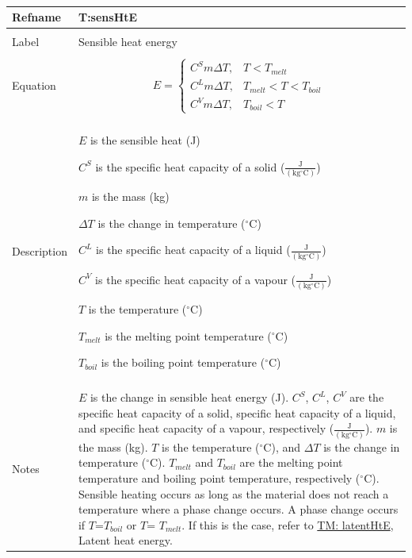 \documentclass[12pt]{article}
\begin{document}
~\newline
\noindent \begin{minipage}{\textwidth}
\begin{tabular}{p{} p{}}
\toprule \textbf{Refname} & \textbf{T:sensHtE}
\label{T:sensHtE}
\\ \midrule \\
Label & Sensible heat energy
\\ \midrule \\
Equation & \begin{dmath}
           E=\begin{cases}
{C^{S}} m ΔT, & T<{T_{melt}}\\
{C^{L}} m ΔT, & {T_{melt}}<T<{T_{boil}}\\
{C^{V}} m ΔT, & {T_{boil}}<T
\end{cases}
           \end{dmath}
\\ \midrule \\
Description & \begin{symbDescription}
              \item{$E$ is the sensible heat (J)}
              \item{${C^{S}}$ is the specific heat capacity of a solid ($\frac{\text{J}}{(\text{kg}{}^{\circ}\text{C})}$)}
              \item{$m$ is the mass (kg)}
              \item{$ΔT$ is the change in temperature (${}^{\circ}$C)}
              \item{${C^{L}}$ is the specific heat capacity of a liquid ($\frac{\text{J}}{(\text{kg}{}^{\circ}\text{C})}$)}
              \item{${C^{V}}$ is the specific heat capacity of a vapour ($\frac{\text{J}}{(\text{kg}{}^{\circ}\text{C})}$)}
              \item{$T$ is the temperature (${}^{\circ}$C)}
              \item{${T_{melt}}$ is the melting point temperature (${}^{\circ}$C)}
              \item{${T_{boil}}$ is the boiling point temperature (${}^{\circ}$C)}
              \end{symbDescription}
\\ \midrule \\
Notes & $E$ is the change in sensible heat energy (J). ${C^{S}}$, ${C^{L}}$, ${C^{V}}$ are the specific heat capacity of a solid, specific heat capacity of a liquid, and specific heat capacity of a vapour, respectively ($\frac{\text{J}}{(\text{kg}{}^{\circ}\text{C})}$). $m$ is the mass (kg). $T$ is the temperature (${}^{\circ}$C), and $ΔT$ is the change in temperature (${}^{\circ}$C). ${T_{melt}}$ and ${T_{boil}}$ are the melting point temperature and boiling point temperature, respectively (${}^{\circ}$C). Sensible heating occurs as long as the material does not reach a temperature where a phase change occurs. A phase change occurs if $T$=${T_{boil}}$ or $T$= ${T_{melt}}$. If this is the case, refer to \hyperref[T:latentHtE]{TM: latentHtE}, Latent heat energy.

\end{tabular}
\end{minipage}
\end{document}
